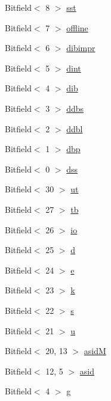 \begin{DoxyCompactItemize}
Bitfield$<$ 8 $>$ \hyperlink{namespaceMipsISA_a4cc396bf955458d1f8f838922167ee4a}{sst}
\item 
Bitfield$<$ 7 $>$ \hyperlink{namespaceMipsISA_a2049c9a70bdc8ee8d780d140564109d6}{offline}
\item 
Bitfield$<$ 6 $>$ \hyperlink{namespaceMipsISA_a9e8ce2fcb477f7cfaf3b96910fff85b7}{dibimpr}
\item 
Bitfield$<$ 5 $>$ \hyperlink{namespaceMipsISA_aed47aeefc09617cb8eb43344b41b29ba}{dint}
\item 
Bitfield$<$ 4 $>$ \hyperlink{namespaceMipsISA_a23476b3dc82771bdc29fbb1ecf5e022d}{dib}
\item 
Bitfield$<$ 3 $>$ \hyperlink{namespaceMipsISA_a298f77026dd0247165e3b7a67fce8e90}{ddbs}
\item 
Bitfield$<$ 2 $>$ \hyperlink{namespaceMipsISA_a236726865d37ef7f3fbb0506a7a0895d}{ddbl}
\item 
Bitfield$<$ 1 $>$ \hyperlink{namespaceMipsISA_ae3d691c11dd543efafa2b88aba7b617c}{dbp}
\item 
Bitfield$<$ 0 $>$ \hyperlink{namespaceMipsISA_ab60f27404f01653104f8cd2cd4fa9922}{dss}
\item 
Bitfield$<$ 30 $>$ \hyperlink{namespaceMipsISA_aa871a0e4096d20e353a39d933932e2b8}{ut}
\item 
Bitfield$<$ 27 $>$ \hyperlink{namespaceMipsISA_a3449fa08e02b23440cc36b67b915efb5}{tb}
\item 
Bitfield$<$ 26 $>$ \hyperlink{namespaceMipsISA_aa2c7ccd28a80dbebe704de32312ec3ac}{io}
\item 
Bitfield$<$ 25 $>$ \hyperlink{namespaceMipsISA_af6d29ee0043ba0776368f331b3a575cc}{d}
\item 
Bitfield$<$ 24 $>$ \hyperlink{namespaceMipsISA_a6be71739c6e49d0bbbd4d7bb97e0853a}{e}
\item 
Bitfield$<$ 23 $>$ \hyperlink{namespaceMipsISA_aef5e9ad990297740e743c7dbff9b9749}{k}
\item 
Bitfield$<$ 22 $>$ \hyperlink{namespaceMipsISA_a209620662d8286467e6fb5140ec75e11}{s}
\item 
Bitfield$<$ 21 $>$ \hyperlink{namespaceMipsISA_a2fc27c327acf2caaf8abc0ce0bd17aa7}{u}
\item 
Bitfield$<$ 20, 13 $>$ \hyperlink{namespaceMipsISA_a829ac0f83b9e8a2ea1780f41621184d9}{asidM}
\item 
Bitfield$<$ 12, 5 $>$ \hyperlink{namespaceMipsISA_a304206a8cceb9cd568b9d24d7528c148}{asid}
\item 
Bitfield$<$ 4 $>$ \hyperlink{namespaceMipsISA_adaa97a14cfbb88776805aa7e304aa2ce}{g}

\end{DoxyCompactItemize}
